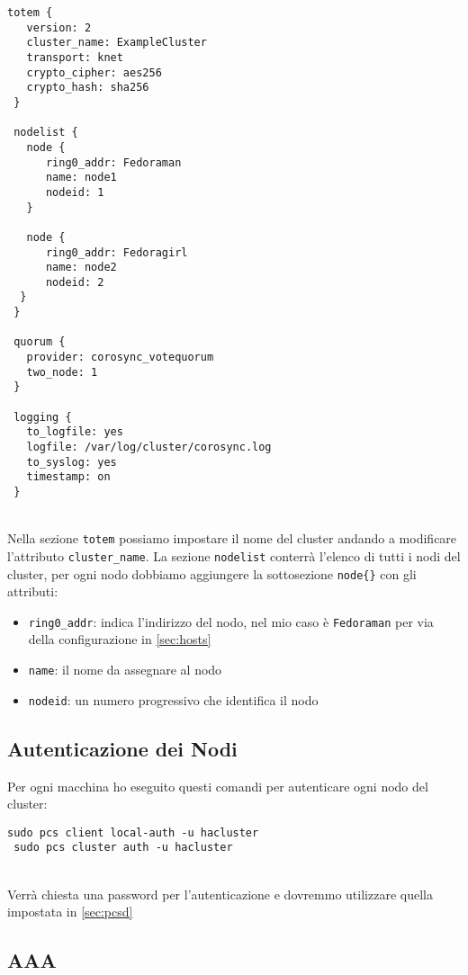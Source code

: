 \begin{lstlisting}[style=cmd]
 totem {
   version: 2
   cluster_name: ExampleCluster
   transport: knet
   crypto_cipher: aes256
   crypto_hash: sha256
 }

 nodelist {
   node {
      ring0_addr: Fedoraman
      name: node1
      nodeid: 1
   }
	
   node {
      ring0_addr: Fedoragirl
      name: node2
      nodeid: 2
  }
 }

 quorum {
   provider: corosync_votequorum
   two_node: 1
 }

 logging {
   to_logfile: yes
   logfile: /var/log/cluster/corosync.log
   to_syslog: yes
   timestamp: on
 }
\end{lstlisting}
\ \\
Nella sezione \lstinline[style=cmd]|totem| possiamo impostare il nome del cluster andando a modificare l'attributo \lstinline[style=cmd]|cluster_name|. La sezione \lstinline[style=cmd]|nodelist| conterr\`{a} l'elenco di tutti i nodi del cluster, per ogni nodo dobbiamo aggiungere la sottosezione \lstinline[style=cmd]|node{}| con gli attributi:

\begin{itemize}
	\item \lstinline[style=cmd]|ring0_addr|: indica l'indirizzo del nodo, nel mio caso \`{e} \lstinline[style=cmd]|Fedoraman| per via della configurazione in \autoref{sec:hosts}
	\item \lstinline[style=cmd]|name|: il nome da assegnare al nodo
	\item \lstinline[style=cmd]|nodeid|: un numero progressivo che identifica il nodo
\end{itemize}

\subsection{Autenticazione dei Nodi}

Per ogni macchina ho eseguito questi comandi per autenticare ogni nodo del cluster:

\begin{lstlisting}[style=cmd]
 sudo pcs client local-auth -u hacluster
 sudo pcs cluster auth -u hacluster
\end{lstlisting}
\ \\
Verr\`{a} chiesta una password per l'autenticazione e dovremmo utilizzare quella impostata in \autoref{sec:pcsd}

\subsection{AAA}

